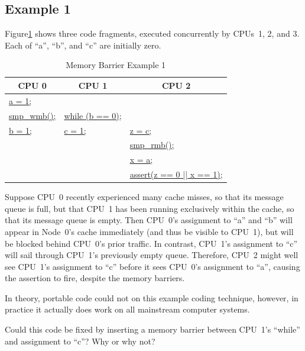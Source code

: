 \subsection{Example 1}
\label{sec:app:whymb:Example 1}

Figure\ref{tab:app:whymb:Memory Barrier Example 1}
shows three code fragments, executed concurrently by CPUs~1, 2, and 3.
Each of ``a'', ``b'', and ``c'' are initially zero.

\begin{table}
\small
\begin{center}
\begin{tabular}{l|l|l}
	\multicolumn{1}{c|}{CPU 0} &
		\multicolumn{1}{c|}{CPU 1} &
			\multicolumn{1}{c}{CPU 2} \\
	\hline
	\hline
	\url{a = 1;}	 &		& \\
	\url{smp_wmb();} & \url{while (b == 0)}; & \\
	\url{b = 1;}	 & \url{c = 1;} & \url{z = c;} \\
			 &		& \url{smp_rmb();} \\
			 &		& \url{x = a;} \\
			 &		& \url{assert(z == 0 || x == 1);} \\
\end{tabular}
\end{center}
\caption{Memory Barrier Example 1}
\label{tab:app:whymb:Memory Barrier Example 1}
\end{table}

Suppose CPU~0 recently experienced many cache misses, so that its
message queue is full, but that CPU~1 has been running exclusively within
the cache, so that its message queue is empty.
Then CPU~0's assignment to ``a'' and ``b'' will appear in Node~0's cache
immediately (and thus be visible to CPU~1), but will be blocked behind
CPU~0's prior traffic.
In contrast, CPU~1's assignment to ``c'' will sail through CPU~1's
previously empty queue.
Therefore, CPU~2 might well see CPU~1's assignment to ``c'' before
it sees CPU~0's assignment to ``a'', causing the assertion to fire,
despite the memory barriers.

In theory, portable code could not on this example coding technique,
however, in practice it actually does work on all mainstream computer systems.

\QuickQuiz{}
	Could this code be fixed by inserting a memory barrier
	between CPU~1's ``while'' and assignment to ``c''?
	Why or why not?
 \QuickQuizEnd

